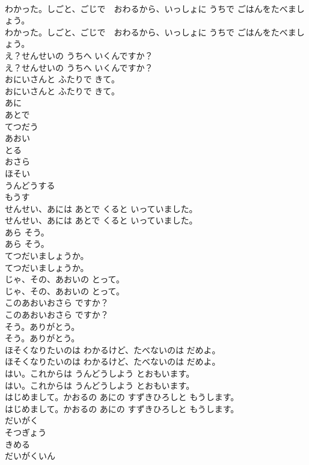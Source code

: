 \documentclass[8pt]{extreport}
\begin{document}
\begin{CJK}{UTF8}{min}
\\	わかった。しごと、ごじで　おわるから、いっしょに うちで ごはんをたべましょう。
\\	わかった。しごと、ごじで　おわるから、いっしょに うちで ごはんをたべましょう。
\\	え？せんせいの うちへ いくんですか？
\\	え？せんせいの うちへ いくんですか？
\\	おにいさんと ふたりで きて。
\\	おにいさんと ふたりで きて。
\\	あに
\\	あとで
\\	てつだう
\\	あおい
\\	とる
\\	おさら
\\	ほそい
\\	うんどうする
\\	もうす
\\	せんせい、あには あとで くると いっていました。
\\	せんせい、あには あとで くると いっていました。
\\	あら そう。
\\	あら そう。
\\	てつだいましょうか。
\\	てつだいましょうか。
\\	じゃ、その、あおいの とって。
\\	じゃ、その、あおいの とって。
\\	このあおいおさら ですか？
\\	このあおいおさら ですか？
\\	そう。ありがとう。
\\	そう。ありがとう。
\\	ほそくなりたいのは わかるけど、たべないのは だめよ。
\\	ほそくなりたいのは わかるけど、たべないのは だめよ。
\\	はい。これからは うんどうしよう とおもいます。
\\	はい。これからは うんどうしよう とおもいます。
\\	はじめまして。かおるの あにの すずきひろしと もうします。
\\	はじめまして。かおるの あにの すずきひろしと もうします。
\\	だいがく
\\	そつぎょう
\\	きめる
\\	だいがくいん

\end{CJK}
\end{document}
